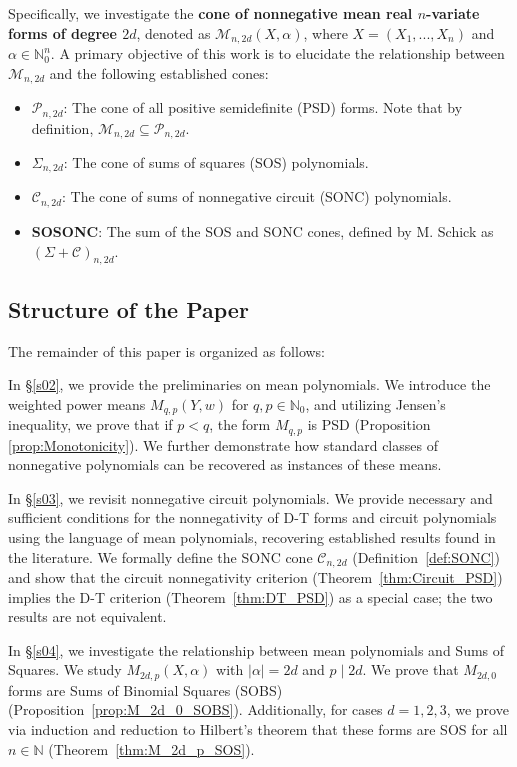 \documentclass{article}
\begin{document}
Specifically, we investigate the \textbf{cone of nonnegative mean real $n$-variate forms of 
degree $2d$}, denoted as $\mathcal{M}_{n,2d}(X,\alpha)$, where $X = (X_{1},...,X_{n})$ and 
$\alpha \in \mathbb{N}_{0}^{n}$. A primary objective of this work is to elucidate 
the relationship between $\mathcal{M}_{n,2d}$ and the following established cones:
\begin{itemize}
    \item $\mathcal{P}_{n,2d}$: The cone of all positive semidefinite (PSD) forms. Note that by definition, 
    $\mathcal{M}_{n,2d} \subseteq \mathcal{P}_{n,2d}$.
    \item $\Sigma_{n,2d}$: The cone of sums of squares (SOS) polynomials.
    \item $\mathcal{C}_{n,2d}$: The cone of sums of nonnegative circuit (SONC) polynomials.
   \item \textbf{SOSONC}: The sum of the SOS and SONC cones, defined by M. Schick as 
   $(\Sigma + \mathcal{C})_{n,2d}$.
\end{itemize}

\subsection*{Structure of the Paper}
The remainder of this paper is organized as follows:

In \S\ref{s02}, we provide the preliminaries on mean polynomials. We introduce the weighted power means 
$M_{q,p}(Y,w)$ for $q, p \in \mathbb{N}_0$, and utilizing Jensen's inequality, we prove that if $p < q$, 
the form $M_{q,p}$ is PSD (Proposition \ref{prop:Monotonicity}). We further demonstrate how standard classes 
of nonnegative polynomials can be recovered as instances of these means.

In \S\ref{s03}, we revisit nonnegative circuit polynomials. We provide necessary and sufficient conditions 
for the nonnegativity of D-T forms and circuit polynomials using the language of mean polynomials, recovering 
established results found in the literature. We formally define the SONC cone $\mathcal{C}_{n,2d}$ 
(Definition~\ref{def:SONC}) and show that the circuit nonnegativity criterion 
(Theorem~\ref{thm:Circuit_PSD}) implies the D-T criterion (Theorem~\ref{thm:DT_PSD}) as a special case; 
the two results are not equivalent.

In \S\ref{s04}, we investigate the relationship between mean polynomials and Sums of Squares. We study 
$M_{2d,p}(X,\alpha)$ with $|\alpha| = 2d$ and $p \mid 2d$. We prove that $M_{2d,0}$ forms are Sums of 
Binomial Squares (SOBS) (Proposition~\ref{prop:M_2d_0_SOBS}). Additionally, for cases $d = 1, 2, 3$, we prove via induction 
and reduction to Hilbert's theorem that these forms are SOS for all $n \in \mathbb{N}$ (Theorem~\ref{thm:M_2d_p_SOS}).
\end{document}
